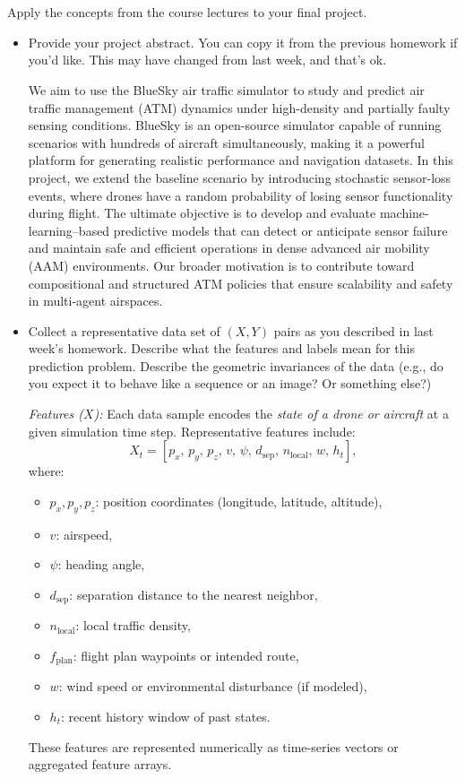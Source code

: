 \documentclass[a4paper]{article}
\begin{document}
\section{}
Apply the concepts from the course lectures to your final project.
\begin{itemize}
    \item Provide your project abstract. You can copy it from the previous homework if you’d like.
        This may have changed from last week, and that’s ok.

We aim to use the BlueSky air traffic simulator to study and predict air traffic management (ATM) dynamics under high-density and partially faulty sensing conditions.
BlueSky is an open-source simulator capable of running scenarios with hundreds of aircraft simultaneously, making it a powerful platform for generating realistic performance and navigation datasets.
In this project, we extend the baseline scenario by introducing stochastic sensor-loss events, where drones have a random probability of losing sensor functionality during flight.
The ultimate objective is to develop and evaluate machine-learning–based predictive models that can detect or anticipate sensor failure and maintain safe and efficient operations in dense advanced air mobility (AAM) environments.
Our broader motivation is to contribute toward compositional and structured ATM policies that ensure scalability and safety in multi-agent airspaces.
    \item Collect a representative data set of $(X, Y)$ pairs as you described in last week’s homework.
        Describe what the features and labels mean for this prediction problem.
        Describe the geometric invariances of the data (e.g., do you expect it to behave like a sequence or an image? Or something else?)


\emph{Features ($X$):}
Each data sample encodes the \emph{state of a drone or aircraft} at a given simulation time step. 
Representative features include:
\[
X_t = [p_x,\, p_y,\, p_z,\, v,\, \psi,\, d_{\text{sep}},\, n_{\text{local}},\, w,\, h_t],
\]
where:
\begin{itemize}
    \item $p_x, p_y, p_z$: position coordinates (longitude, latitude, altitude),
    \item $v$: airspeed,
    \item $\psi$: heading angle,
    \item $d_{\text{sep}}$: separation distance to the nearest neighbor,
    \item $n_{\text{local}}$: local traffic density,
    \item $f_{\text{plan}}$: flight plan waypoints or intended route,
    \item $w$: wind speed or environmental disturbance (if modeled),
    \item $h_t$: recent history window of past states.
\end{itemize}
These features are represented numerically as time-series vectors or aggregated feature arrays.



\end{itemize}
\end{document}

